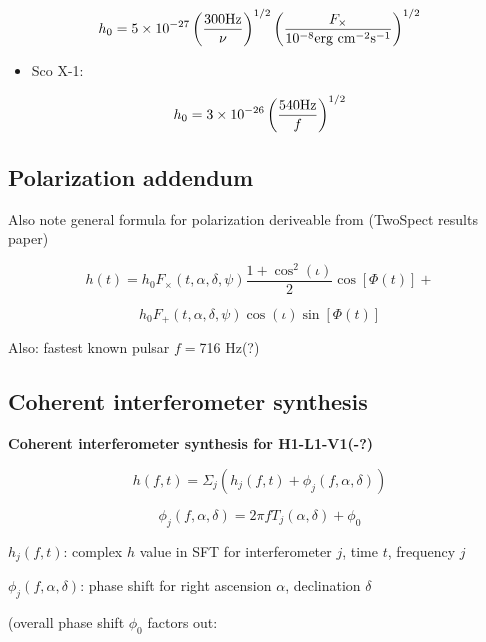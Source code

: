 \[
h_{0}=5\times10^{-27}\left(\frac{300\textup{Hz}}{\nu}\right)^{1/2}\left(\frac{F_{\times}}{10^{-8}\textup{erg cm}^{-2}\textup{s}^{-1}}\right)^{1/2}
\]

\begin{itemize}
\item Sco X-1:
\end{itemize}

\[
h_{0}=3\times10^{-26}\left(\frac{540\textup{Hz}}{f}\right)^{1/2}
\]



\subsection{Polarization addendum}


Also note general formula for polarization deriveable from (TwoSpect
results paper)


\[
h(t)=h_{0}F_{\times}(t,\alpha,\delta,\psi)\frac{1+\cos^{2}(\iota)}{2}\cos[\Phi(t)]+
\]



\[
h_{0}F_{+}(t,\alpha,\delta,\psi)\cos(\iota)\sin[\Phi(t)]
\]



Also: fastest known pulsar $f=$716 Hz(?)



\subsection{Coherent interferometer synthesis}


\textbf{Coherent interferometer synthesis for H1-L1-V1(-?)}


\[
h(f,t)=\Sigma_{j}\left(h_{j}(f,t)+\phi_{j}(f,\alpha,\delta)\right)
\]



\[
\phi_{j}(f,\alpha,\delta)=2\pi fT_{j}(\alpha,\delta)+\phi_{0}
\]



\emph{$h_{j}(f,t)$}: complex $h$ value in SFT for interferometer
$j$, time $t$, frequency $j$


$\phi_{j}(f,\alpha,\delta)$: phase shift for right ascension $\alpha$,
declination $\delta$


(overall phase shift $\phi_{0}$ factors out: 


